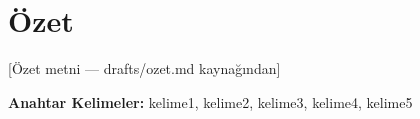 \chapter*{Özet}
[Özet metni — drafts/ozet.md kaynağından]
\par\noindent\textbf{Anahtar Kelimeler:} kelime1, kelime2, kelime3, kelime4, kelime5
